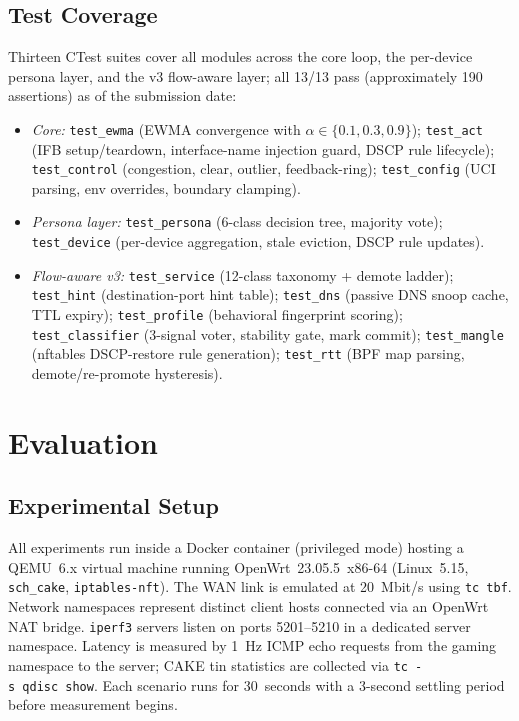 \documentclass[conference]{IEEEtran}
\begin{document}
\subsection{Test Coverage}

Thirteen CTest suites cover all modules across the core loop, the
per-device persona layer, and the v3 flow-aware layer; all 13/13 pass
(approximately 190 assertions) as of the submission date:
\begin{itemize}
  \item \emph{Core:}
    \texttt{test\_ewma} (EWMA convergence with $\alpha \in \{0.1, 0.3, 0.9\}$);
    \texttt{test\_act} (IFB setup/teardown, interface-name injection guard,
    DSCP rule lifecycle);
    \texttt{test\_control} (congestion, clear, outlier, feedback-ring);
    \texttt{test\_config} (UCI parsing, env overrides, boundary clamping).
  \item \emph{Persona layer:}
    \texttt{test\_persona} (6-class decision tree, majority vote);
    \texttt{test\_device} (per-device aggregation, stale eviction, DSCP
    rule updates).
  \item \emph{Flow-aware v3:}
    \texttt{test\_service} (12-class taxonomy + demote ladder);
    \texttt{test\_hint} (destination-port hint table);
    \texttt{test\_dns} (passive DNS snoop cache, TTL expiry);
    \texttt{test\_profile} (behavioral fingerprint scoring);
    \texttt{test\_classifier} (3-signal voter, stability gate, mark commit);
    \texttt{test\_mangle} (nftables DSCP-restore rule generation);
    \texttt{test\_rtt} (BPF map parsing, demote/re-promote hysteresis).
\end{itemize}


\section{Evaluation}
\label{sec:eval}

\subsection{Experimental Setup}

All experiments run inside a Docker container (privileged mode) hosting a
QEMU~6.x virtual machine running OpenWrt~23.05.5~x86-64
(Linux~5.15, \texttt{sch\_cake}, \texttt{iptables-nft}).
The WAN link is emulated at 20~Mbit/s using \texttt{tc~tbf}.
Network namespaces represent distinct client hosts connected via an OpenWrt
NAT bridge.
\texttt{iperf3} servers listen on ports 5201--5210 in a dedicated server
namespace.
Latency is measured by 1~Hz ICMP echo requests from the gaming namespace to
the server; CAKE tin statistics are collected via \texttt{tc~-s~qdisc~show}.
Each scenario runs for 30~seconds with a 3-second settling period before
measurement begins.
\end{document}
